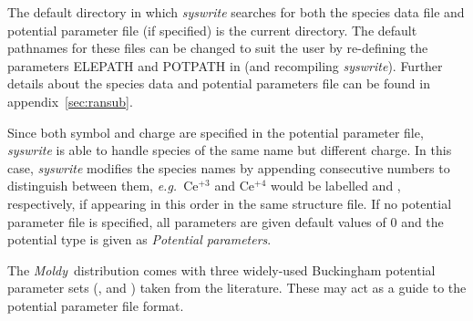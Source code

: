 \documentclass[a4paper,twoside]{report}
\newcommand{\moldy}{\emph{Moldy}}
\newcommand{\eg}{\emph{e.g.}}
\begin{document}
The default directory in which \emph{syswrite} searches for both the
species data file and potential parameter file (if specified) is the
current directory. The default pathnames for these
files can be changed to suit the user by re-defining the
parameters ELEPATH and POTPATH in  (and
recompiling \emph{syswrite}). Further details about the species data
and potential parameters file can be found in appendix~\ref{sec:ransub}.

Since both symbol and charge are specified in the potential parameter file,
\emph{syswrite} is able to handle species of the same name but different charge.
In this case, \emph{syswrite} modifies the species names by appending consecutive
numbers to distinguish between them, \eg\ Ce$^{+3}$ and Ce$^{+4}$ would be labelled
 and , respectively, if appearing in this order in the same
structure file. If no potential parameter file is specified, all
parameters are given default values of 0 and the potential type is given
as \textit{Potential parameters}.

The \moldy\ distribution comes with three widely-used Buckingham potential
parameter sets (,  and
) taken from the literature. These may act as a guide
to the potential parameter file format.



\end{document}
